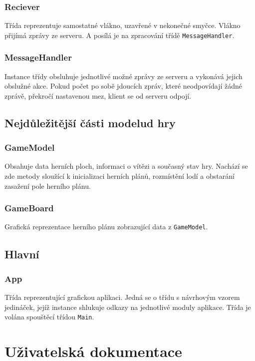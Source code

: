 \documentclass[12pt, a4paper]{article} %
\begin{document}
	\subsubsection{Reciever}
	\par Třída reprezentuje samostatné vlákno, uzavřené v nekonečné smyčce. Vlákno přijímá zprávy ze serveru. A posílá je na zpracování třídě \texttt{MessageHandler}.
	
	\subsubsection{MessageHandler}
	\par Instance třídy obsluhuje jednotlivé možné zprávy ze serveru a vykonává jejich obslužné akce. Pokud počet po sobě jdoucích zpráv, které neodpovídají žádné zprávě, překročí nastavenou mez, klient se od serveru odpojí.
	
	
	\subsection{Nejdůležitější části modelud hry}
	\subsubsection{GameModel}
	\par Obsahuje data herních ploch, informaci o vítězi a současný stav hry. Nachází se zde metody sloužící k inicializaci herních plánů, rozmístění lodí a obstarání  zasažení pole herního plánu.
	
	\subsubsection{GameBoard}
	\par Grafická reprezentace herního plánu zobrazující data z \texttt{GameModel}.
	\subsection{Hlavní}
	\subsubsection{App}
	\par Třída reprezentující grafickou aplikaci. Jedná se o třídu s návrhovým vzorem jedináček, jejíž  instance shlukuje odkazy na jednotlivé moduly aplikace. Třída je volána spouštěcí třídou \texttt{Main}.
	
	\section{Uživatelská dokumentace}
\end{document}
